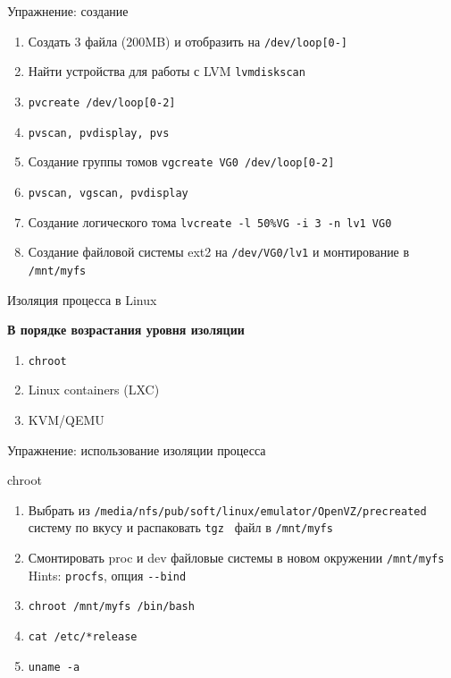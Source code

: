 \begin{frame}{Упражнение: создание}
  \begin{enumerate}
    \item Создать 3 файла (200MB) и отобразить на {\tt /dev/loop[0-]}
	\item Найти устройства для работы с LVM {\tt lvmdiskscan}
	\item  {\tt pvcreate /dev/loop[0-2]}
    \item  {\tt pvscan, pvdisplay, pvs}
		\pause
    \item Создание группы томов {\tt vgcreate VG0 /dev/loop[0-2]}
    \item {\tt pvscan, vgscan, pvdisplay}
		\pause
    \item Создание логического тома {\tt lvcreate  -l 50\%VG -i 3 -n lv1 VG0}
	\item Создание файловой системы ext2 на {\tt /dev/VG0/lv1} и монтирование в {\tt /mnt/myfs}
	\end{enumerate}
\end{frame}

\begin{frame}{Изоляция процесса в Linux}
  \begin{center}
    \textbf{В порядке возрастания уровня изоляции}
  \end{center}
  \begin{enumerate}
    \item {\tt chroot}
    \item Linux containers (LXC)
    \item KVM/QEMU
  \end{enumerate}
\end{frame}

\begin{frame}{Упражнение: использование изоляции процесса}
  \begin{block}{chroot}
    \begin{enumerate}
      \item Выбрать из {\tt /media/nfs/pub/soft/linux/emulator/OpenVZ/precreated} систему по вкусу и распаковать {\tt tgz } файл в {\tt /mnt/myfs}
      \item Смонтировать proc и dev файловые системы в новом окружении {\tt /mnt/myfs} \\
		  Hints: {\tt procfs}, опция {\tt -\phantom{}-bind}
      \item {\tt chroot /mnt/myfs /bin/bash}
	  \item {\tt cat /etc/*release}
	  \item {\tt uname -a}
    \end{enumerate}
  \end{block}
\end{frame}

